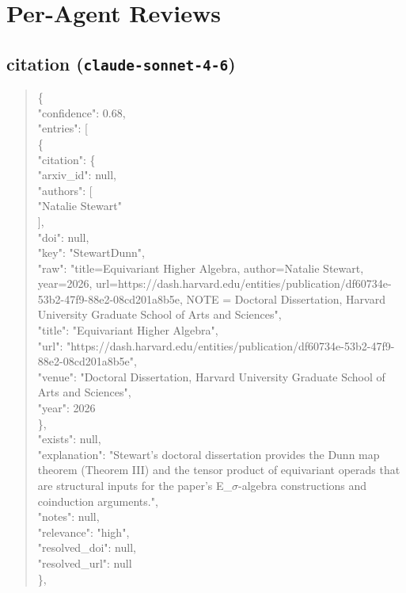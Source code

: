 \documentclass[11pt]{article}
\begin{document}
\section*{Per-Agent Reviews}
\subsection*{citation (\texttt{claude-sonnet-4-6})}
\begin{quote}\small\ttfamily\raggedright
\{\\
  "confidence": 0.68,\\
  "entries": [\\
    \{\\
      "citation": \{\\
        "arxiv\_id": null,\\
        "authors": [\\
          "Natalie Stewart"\\
        ],\\
        "doi": null,\\
        "key": "StewartDunn",\\
        "raw": "title=Equivariant Higher Algebra, author=Natalie Stewart, year=2026, url=https://dash.harvard.edu/entities/publication/df60734e-53b2-47f9-88e2-08cd201a8b5e, NOTE = Doctoral Dissertation, Harvard University Graduate School of Arts and Sciences",\\
        "title": "Equivariant Higher Algebra",\\
        "url": "https://dash.harvard.edu/entities/publication/df60734e-53b2-47f9-88e2-08cd201a8b5e",\\
        "venue": "Doctoral Dissertation, Harvard University Graduate School of Arts and Sciences",\\
        "year": 2026\\
      \},\\
      "exists": null,\\
      "explanation": "Stewart's doctoral dissertation provides the Dunn map theorem (Theorem III) and the tensor product of equivariant operads that are structural inputs for the paper's E\_\ensuremath{\sigma}-algebra constructions and coinduction arguments.",\\
      "notes": null,\\
      "relevance": "high",\\
      "resolved\_doi": null,\\
      "resolved\_url": null\\
    \},\\

\end{quote}
\end{document}
